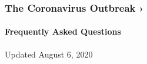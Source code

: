 \href{https://www.nytimes.com/news-event/coronavirus?action=click\&pgtype=Article\&state=default\&region=MAIN_CONTENT_3\&context=storylines_faq}{}

\hypertarget{the-coronavirus-outbreak-}{%
\subsubsection{The Coronavirus Outbreak
›}\label{the-coronavirus-outbreak-}}

\hypertarget{frequently-asked-questions}{%
\paragraph{Frequently Asked
Questions}\label{frequently-asked-questions}}

Updated August 6, 2020

